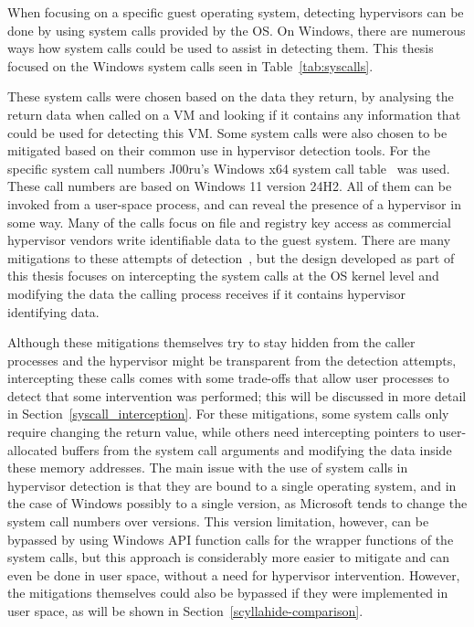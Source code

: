 When focusing on a specific guest operating system, detecting hypervisors can be done by using system calls provided by the OS. 
On Windows, there are numerous ways how system calls could be used to assist in detecting them. This thesis focused on the Windows system calls seen in Table~\ref{tab:syscalls}. 

These system calls were chosen based on the data they return, by analysing the return data when called on a VM and looking if it contains any information that could be used for detecting this VM. Some system calls were also chosen
to be mitigated based on their common use in hypervisor detection tools.
For the specific system call numbers J00ru's Windows x64 system call table~\cite{j00ruSyscalls} was used. These call numbers are based on Windows 11 version 24H2. All of them can be invoked from a user-space process, and can reveal the presence of a hypervisor in some way. 
Many of the calls focus on file and registry key access as commercial hypervisor vendors write identifiable data to the guest system. 
There are many mitigations to these attempts of detection~\cite{yang2024makingsyscallprivilegeright, 11027539}, but the design developed as part of this thesis focuses on intercepting the system calls at the OS kernel level 
and modifying the data the calling process receives if it contains hypervisor identifying data.

Although these mitigations themselves try to stay hidden from the caller processes and the hypervisor might be transparent from the detection attempts, intercepting these calls comes with some trade-offs that allow user processes to detect that
some intervention was performed; this will be discussed in more detail in Section~\ref{syscall_interception}.
For these mitigations, some system calls only require changing the return value, while others need intercepting pointers to user-allocated buffers from the system call arguments and modifying the data inside these memory addresses.
The main issue with the use of system calls in hypervisor detection is that they are bound to a single operating system, and in the case of Windows possibly to a single version, as Microsoft tends to change the system call numbers over versions.
This version limitation, however, can be bypassed by using Windows API function calls for the wrapper functions of the system calls, but this approach is considerably more easier to mitigate and can even be done in user space, without a need for hypervisor intervention.
However, the mitigations themselves could also be bypassed if they were implemented in user space, as will be shown in Section~\ref{scyllahide-comparison}.

